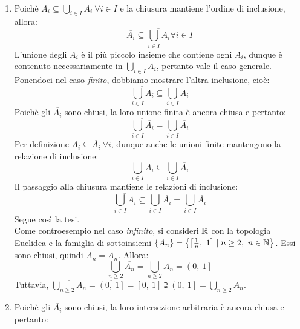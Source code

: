 \begin{demonstration}~{}
	\begin{enumerate}[label=\Roman*]
	\item Poichè $A_i\subseteq \bigcup_{i\in I}A_i\ \forall i\in I$ e la chiusura mantiene l'ordine di inclusione, allora:
	\begin{equation*}
		\overline{A_i}\subseteq \overline{\bigcup_{i\in I}A_i}\forall i\in I
	\end{equation*}
	L'unione degli $A_i$ è il più piccolo insieme che contiene ogni $\overline{A_i}$, dunque è contenuto necessariamente in $\displaystyle \overline{\bigcup_{i\in I}A_i}$, pertanto vale il caso generale.\\
	Ponendoci nel caso \textit{finito}, dobbiamo mostrare l'altra inclusione, cioè:
	\begin{equation*}
		\overline{\bigcup_{i\in I}A_i}\subseteq\bigcup_{i\in I}\overline{A_i}
	\end{equation*}
	Poichè gli $\overline{A_i}$ sono chiusi, la loro unione finita è ancora chiusa e pertanto:
	\begin{equation*}
		\overline{\bigcup_{i\in I}\overline{A_i}}=\bigcup_{i\in I}\overline{A_i}
	\end{equation*}
	Per definizione $A_i\subseteq\overline{A_i}\ \forall i$, dunque anche le unioni finite mantengono la relazione di inclusione:
	\begin{equation*}
		\bigcup_{i\in I}A_i\subseteq\bigcup_{i\in I}\overline{A_i}
	\end{equation*}
	Il passaggio alla chiusura mantiene le relazioni di inclusione:
	\begin{equation*}
			\overline{\bigcup_{i\in I}A_i}\subseteq\overline{\bigcup_{i\in I}\overline{A_i}}=\bigcup_{i\in I}\overline{A_i}
	\end{equation*}
	Segue così la tesi.\\
	Come controesempio nel caso \textit{infinito}, si consideri $\mathbb{R}$ con la topologia Euclidea e la famiglia di sottoinsiemi $\left\{A_n\right\}=\left\{\left[\frac{1}{n},\ 1\right]\mid n\geq 2,\ n\in \naturalset\right\}$. Essi sono chiusi, quindi $A_n=\overline{A_n}$. Allora:
	\begin{equation*}
		\bigcup_{n\geq 2}\overline{A_n}=\bigcup_{n\geq 2}A_n=\left(0,\ 1\right]
	\end{equation*}
Tuttavia, $\displaystyle \overline{\bigcup_{n\geq 2}A_n}=\overline{\left(0,\ 1\right]}=\left[0,\ 1\right]\supsetneqq\left(0,\ 1\right]=\bigcup_{n\geq 2}\overline{A_n}$.
\item Poichè gli $\overline{A_i}$ sono chiusi, la loro intersezione arbitraria è ancora chiusa e pertanto:

\end{enumerate}
\end{demonstration}
